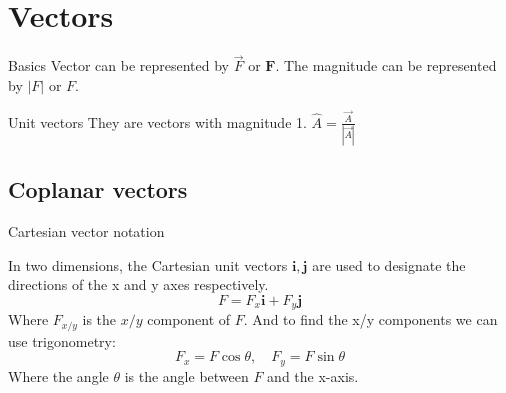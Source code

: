 
\section{Vectors}

\begin{definition}[]{Basics}
    Vector can be represented by $\vec{F}$ or $\boldsymbol{F}$. The magnitude can be represented by $|F|$ or $F$.
\end{definition}

\begin{knBox}[]{Unit vectors}
    They are vectors with magnitude 1. $\hat{A}=\frac{\vec{A}}{|\vec{A}|}$
\end{knBox}

\subsection{Coplanar vectors}
\begin{definition}
    {Cartesian vector notation}

    In two dimensions, the Cartesian unit vectors $\boldsymbol{i}, \boldsymbol{j}$ are used to designate the directions of the x and y axes respectively.
    \[F=F_x \boldsymbol{i} + F_y \boldsymbol{j}\]
    Where $F_{x/y}$ is the $x/y$ component of $F$. And to find the x/y components we can use trigonometry:
    \[F_x=F\cos{\theta},\quad F_y=F\sin{\theta}\]
    Where the angle $\theta$ is the angle between $F$ and the x-axis.
\end{definition}

